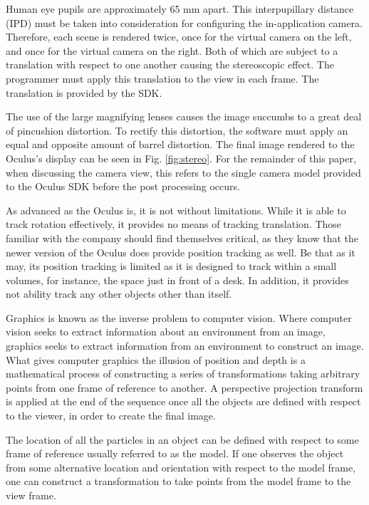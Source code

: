 Human eye pupils are approximately 65 mm apart.  This interpupillary distance
(IPD) must be taken into consideration for configuring the in-application
camera. Therefore, each scene is rendered twice, once for the virtual camera on
the left, and once for the virtual camera on the right. Both of which are
subject to a translation with respect to one another causing the stereoscopic
effect. The programmer must apply this translation to the view in each frame.
The translation is provided by the SDK.

The use of the large magnifying lenses causes the image succumbs to a great
deal of pincushion distortion. To rectify this distortion, the software must
apply an equal and opposite amount of barrel distortion. The final image
rendered to the Oculus's display can be seen in Fig. \ref{fig:stereo}. For the
remainder of this paper, when discussing the camera view, this refers to the
single camera model provided to the Oculus SDK before the post processing
occurs. 

As advanced as the Oculus is, it is not without limitations.  While it is able
to track rotation effectively, it provides no means of tracking translation.
Those familiar with the company should find themselves critical, as they know
that the newer version of the Oculus does provide position tracking as well.
Be that as it may, its position tracking is limited as it is designed to track
within a small volumes, for instance, the space just in front of a desk. In
addition, it provides not ability track any other objects other than itself.

Graphics is known as the inverse problem to computer vision. Where computer
vision seeks to extract information about an environment from an image,
graphics seeks to extract information from an environment to construct an
image. What gives computer graphics the illusion of position and depth is a
mathematical process of constructing a series of transformations taking
arbitrary points from one frame of reference to another.  A perspective
projection transform is applied at the end of the sequence once all the objects
are defined with respect to the viewer, in order to create the final image.

The location of all the particles in an object can be defined with respect to
some frame of reference usually referred to as the model. If one observes the
object from some alternative location and orientation with respect to the model
frame, one can construct a transformation to take points from the model frame
to the view frame.

